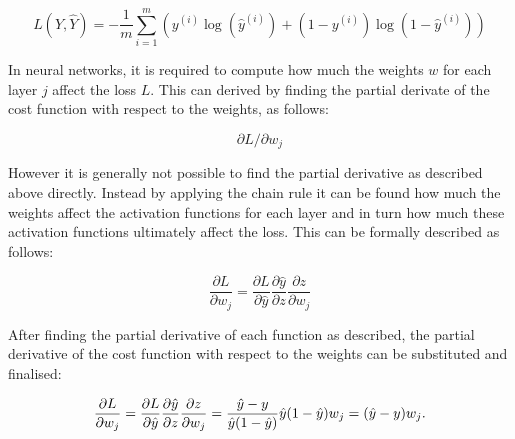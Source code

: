 \begin{equation}
L(Y, \hat{Y}) = -\frac{1}{m} \sum_{i=1}^m \left( y^{(i)} \log(\hat{y}^{(i)}) + (1-y^{(i)}) \log(1-\hat{y}^{(i)}) \right)
\end{equation}


In neural networks, it is required to compute how much the weights $w$ for each layer $j$  affect  the loss $L$. This can derived by finding the partial derivate of the cost function with respect to the weights, as follows:

\begin{equation}
\partial L / \partial w_j
\end{equation}

However it is generally not possible to find the partial derivative as described above directly. Instead by applying the chain rule it can be found how much the weights affect the activation functions for each layer and in turn how much these activation functions ultimately affect the loss. This can be formally described as follows:

\begin{equation}
\frac{\partial L}{\partial w_j} = \frac{\partial L}{\partial \hat{y}} \frac{\partial \hat{y}}{\partial z} \frac{\partial z}{\partial w_j}
\end{equation}

After finding the partial derivative of each function as described, the partial derivative of the cost function with respect to the weights can be substituted and finalised:

\begin{equation}
    \frac{\partial L}{\partial w_j} = \frac{\partial L}{\partial \hat{y}} \frac{\partial \hat{y}}{\partial z} \frac{\partial z}{\partial w_j}\newline
    = \frac{\hat{y} - y}{\hat{y}(1 - \hat{y})} \hat{y} (1-\hat{y}) w_j\newline
    = (\hat{y} - y) w_j.\newline
 \end{equation}

